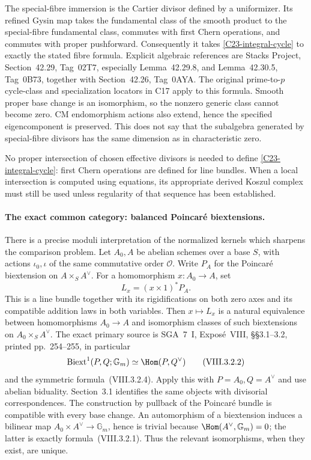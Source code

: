 The special-fibre immersion is the Cartier divisor defined
by a uniformizer.  Its refined Gysin map takes the fundamental
class of the smooth product to the special-fibre fundamental
class, commutes with first Chern operations, and commutes
with proper pushforward.  Consequently it takes
\eqref{C23-integral-cycle} to exactly the stated fibre formula.
Explicit algebraic references are Stacks Project,
Section~42.29, Tag~02T7, especially Lemma~42.29.8,
and Lemma~42.30.5, Tag~0B73, together with
Section~42.26, Tag~0AYA.  The original prime-to-$p$
cycle-class and specialization locators in C17 apply to this
formula.  Smooth proper base change is an isomorphism, so
the nonzero generic class cannot become zero.
CM endomorphism actions also extend, hence the specified
eigencomponent is preserved.  This does not say that the
subalgebra generated by special-fibre divisors has the same
dimension as in characteristic zero.

No proper intersection of chosen effective divisors is needed
to define \eqref{C23-integral-cycle}: first Chern operations
are defined for line bundles.  When a local intersection is
computed using equations, its appropriate derived Koszul
complex must still be used unless regularity of that sequence
has been established.

\paragraph{The exact common category: balanced Poincar\'e biextensions.}
There is a precise moduli interpretation of the normalized
kernels which sharpens the comparison problem.  Let $A_0,A$
be abelian schemes over a base $S$, with actions $\iota_0,\iota$
of the same commutative order $\mathcal O$.  Write $P_A$
for the Poincar\'e biextension on $A\times_S A^\vee$.
For a homomorphism $x:A_0\to A$, set
\[
                   L_x=(x\times1)^*P_A.
\]
This is a line bundle together with its rigidifications on
both zero axes and its compatible addition laws in both
variables.  Then $x\mapsto L_x$ is a natural equivalence
between homomorphisms $A_0\to A$ and isomorphism classes of
such biextensions on $A_0\times_S A^\vee$.
The exact primary source is SGA~7~I, Expos\'e~VIII,
\S\S3.1--3.2, printed pp.~254--255, in particular
\[
 \operatorname{Biext}^1(P,Q;\mathbb G_m)
            \simeq\Hom(P,Q^\vee)
                         \tag{VIII.3.2.2}
\]
and the symmetric formula~(VIII.3.2.4).
Apply this with $P=A_0,Q=A^\vee$ and use abelian biduality.
Section~3.1 identifies the same objects with divisorial
correspondences.  The construction by pullback of the
Poincar\'e bundle is compatible with every base change.
An automorphism of a biextension induces a bilinear map
$A_0\times A^\vee\to\mathbb G_m$, hence is trivial because
$\Hom(A^\vee,\mathbb G_m)=0$; the latter is exactly
formula~(VIII.3.2.1).  Thus the relevant isomorphisms, when
they exist, are unique.

